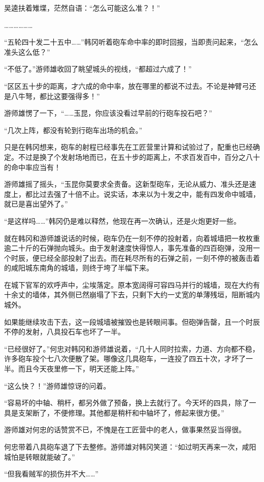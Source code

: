 吴逵扶着雉堞，茫然自语：“怎么可能这么准？！”

………………

“五轮四十发二十五中……”韩冈听着砲车命中率的即时回报，当即责问起来，“怎么准头这么低？”

“不低了。”游师雄收回了眺望城头的视线，“都超过六成了！”

“区区五十步的距离，才六成的命中率，放在哪里的都说不过去。不论是神臂弓还是八牛弩，都比这要强得多！”

游师雄愣了一下，“……玉昆，你应该没看过早前的行砲车投石吧？”

“几次上阵，都没有轮到行砲车出场的机会。”

只是在韩冈想来，砲车的射程已经事先在工匠营里计算和试验过了，配重也已经确定。不过是换了个发射场地而已，在五十步的距离上，不求百发百中，百分之八十的命中率应当有！

游师雄摇了摇头，“玉昆你莫要求全责备。这新型砲车，无论从威力、准头还是速度上，都比过去强了十倍不止。说实话，本来以为十发之中，能有四发命中城墙，就已是喜出望外了。”

“是这样吗……”韩冈仍是难以释然，他现在再一次确认，还是火炮更好一些。

就在韩冈和游师雄说话的时候，砲车仍在一刻不停的投射着，向着城墙把一枚枚重逾二十斤的石弹抛向城头。由于发射速度快得惊人，事先准备的四百砲弹，没用一个时辰，便已经全部投射了出去。而在耗尽所有的石弹之前，一刻不停的被轰击着的咸阳城东南角的城墙，则终于垮了半幅下来。

在城下官军的欢呼声中，尘埃落定。原本宽阔得可容四马并行的城墙，现在大约有十余丈的墙体，其外侧已然崩塌了下去，只剩下大约一丈宽的单薄残垣，阻断城内城外。

如果能继续攻击下去，这一段城墙被摧毁也是转眼间事。但砲弹告罄，且一个时辰不停的发射，八具投石车也坏了一半。

“已经很好了。”何忠对韩冈和游师雄说着，“几十人同时拉索，力道、方向都不稳，许多砲车投个七八次便散了架。哪像这几具砲车，一连投了四五十次，才坏了一半。而且今天夜里修一下，明天还能上阵。”

“这么快？！”游师雄惊讶的问着。

“容易坏的中轴、稍杆，都另外做了预备，换上去就行了。今天坏的四具，除了一具是支架断了，不便修理。其他都是稍杆和中轴坏了，修起来很方便。”

游师雄对何忠的话赞赏不已，不愧是在工匠营中的老人，做事果然妥当得很。

何忠带着八具砲车退了下去整修。游师雄对韩冈笑道：“如过明天再来一次，咸阳城怕是转眼就能破了。”

“但我看贼军的损伤并不大……”

